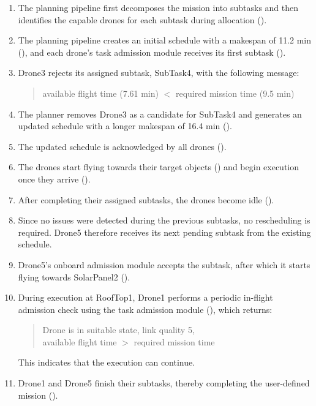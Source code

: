 \begin{enumerate}
    \item The planning pipeline first decomposes the mission into subtasks and then identifies
    the capable drones for each subtask during allocation ().

    \item The planning pipeline creates an initial schedule with a makespan of 11.2 min 
    (), and each drone's task admission module receives its first subtask ().

    \item Drone3 rejects its assigned subtask, SubTask4, with the following message:
    \begin{quote}
    \small\ttfamily
    available flight time (7.61 min) $<$ 
    required mission time (9.5 min)
    \end{quote}

    \item The planner removes Drone3 as a candidate for SubTask4 and 
    generates an updated schedule with a longer makespan of 16.4 min ().

    \item The updated schedule is acknowledged by all drones ().
    
    \item The drones start flying towards their target objects () 
    and begin execution once they arrive ().

    \item After completing their assigned subtasks, the drones become idle ().
    
    \item Since no issues were detected during the previous subtasks, no rescheduling is required. 
    Drone5 therefore receives its next pending subtask from the existing schedule.

    \item Drone5's onboard admission module accepts the subtask, 
    after which it starts flying towards SolarPanel2 ().
    
    \item During execution at RoofTop1, Drone1 performs a periodic in-flight admission check using the task admission module (), which returns:
    \begin{quote}
    \small\ttfamily
    Drone is in suitable state, link quality 5, \\
    available flight time $>$ required mission time
    \end{quote}
    This indicates that the execution can continue.

    \item Drone1 and Drone5 finish their subtasks, thereby completing the user-defined mission ().
\end{enumerate}

